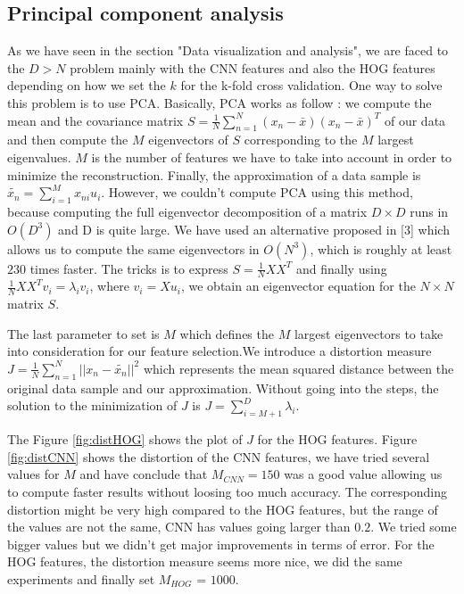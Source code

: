 \documentclass{article} %
\begin{document}
\subsection{Principal component analysis}

As we have seen in the section "Data visualization and analysis", we are faced to the $D > N$ problem mainly with the CNN features and also the HOG features depending on how we set the $k$ for the k-fold cross validation. One way to solve this problem is to use PCA.  Basically, PCA works as follow : we compute the mean and the covariance matrix $S = \frac{1}{N}\sum_{n=1}^{N}(x_n-\bar{x})(x_n-\bar{x})^T$ of our data and then compute the $M$ eigenvectors of $S$ corresponding to the $M$ largest eigenvalues. $M$ is the number of features we have to take into account in order to minimize the reconstruction. Finally, the approximation of a data sample is $\tilde{x_n} = \sum_{i=1}^M x_{ni} u_i$. However, we couldn't compute PCA using this method, because computing the full eigenvector decomposition of a matrix $D \times D$ runs in  $O(D^3)$ and D is quite large. 
We have used an alternative proposed in [3] which allows us to compute the same eigenvectors in $O(N^3)$, which is roughly at least $230$ times faster. The tricks is to express $S = \frac{1}{N}XX^T$ and finally using $\frac{1}{N}XX^Tv_i = \lambda_i v_i$, where $v_i=Xu_i$, we obtain an eigenvector equation for the $N \times N$ matrix $S$.

The last parameter to set is $M$ which defines the $M$ largest eigenvectors to take into consideration for our feature selection.We introduce a distortion measure $J = \frac{1}{N}\sum_{n=1}^{N}||x_n-\tilde{x_n}||^2$ which represents the mean squared distance between the original data sample and our approximation. Without going into the steps, the solution to the minimization of $J$ is $J = \sum_{i=M+1}^D \lambda_i$. 


The Figure \ref{fig:distHOG} shows the plot of $J$ for the HOG features. Figure \ref{fig:distCNN} shows the distortion of the CNN features, we have tried several values for $M$ and have conclude that $M_{CNN} = 150$ was a good value allowing us to compute faster results without loosing too much accuracy. The corresponding distortion might be very high compared to the HOG features, but the range of the values are not the same, CNN has values going larger than $0.2$. We tried some bigger values but we didn't get major improvements in terms of error. For the HOG features, the distortion measure seems more nice, we did the same experiments and finally set $M_{HOG}$ = $1000$. 
\end{document}
